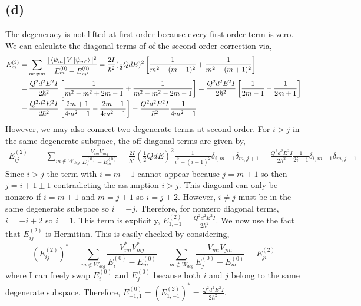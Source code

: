 \documentclass[12pt]{extarticle}
\begin{document}
\subsection*{(d)}

The degeneracy is not lifted at first order because every first order term is zero. We can calculate the diagonal terms of of the second order correction via,
\begin{align*}
E^{(2)}_m & = \sum_{m' \neq m} \frac{|\left< \psi_m \right| V \left| \psi_{m'} \right>|^2}{E^{(0)}_m - E^{(0)}_{m'}} = \frac{2I}{\hbar^2} (\tfrac{1}{2} QdE)^2 \left[ \frac{1}{m^2 - (m - 1)^2} + \frac{1}{m^2 - (m + 1)^2} \right] \\ 
& = \frac{Q^2 d^2 E^2 I}{2\hbar^2} \left[ \frac{1}{m^2 - m^2 + 2m - 1} + \frac{1}{m^2 - m^2 - 2m - 1} \right] = \frac{Q^2 d^2 E^2 I}{2\hbar^2} \left[ \frac{1}{2m - 1} - \frac{1}{2m + 1} \right] \\ & = \frac{Q^2 d^2 E^2 I}{2\hbar^2} \left[ \frac{2m + 1}{4m^2 - 1} - \frac{2m - 1}{4m^2 - 1} \right] = \frac{Q^2 d^2 E^2 I}{\hbar^2} \frac{1}{4m^2 - 1}
\end{align*}
However, we may also connect two degenerate terms at second order. For $i > j$ in the same degenerate subspace, the off-diagonal terms are given by,
\begin{align*}
E^{(2)}_{ij} & = \sum_{m \notin W_{deg}} \frac{V_{im} V_{m j}}{E^{(0)}_i - E^{(0)}_{m}} = \frac{2I}{\hbar^2} (\tfrac{1}{2} QdE)^2 \frac{1}{i^2 - (i - 1)^2} \delta_{i, m + 1} \delta_{m, j + 1} = \frac{Q^2 d^2 E^2 I}{2\hbar^2} \frac{1}{2 i - 1} \delta_{i, m + 1} \delta_{m, j + 1} 
\end{align*}
Since $i > j$ the term with $i = m - 1$ cannot appear because $j = m \pm 1$ so then $j = i + 1 \pm 1$ contradicting the assumption $i > j$. This diagonal can only be nonzero if $i = m + 1$ and $m = j + 1$ so $i = j + 2$. However, $i \neq j$ must be in the same degenerate subspace so $i = - j$. Therefore, for nonzero diagonal terms, $i = -i + 2$ so $i = 1$. This term is explicitly, $E^{(2)}_{1,-1} = \frac{Q^2 d^2 E^2 I}{2\hbar^2}$. We now use the fact that $E^{(2)}_{ij}$ is Hermitian. This is easily checked by considering,
\[ (E^{(2)}_{ij})^* = \sum_{m \notin W_{deg}} \frac{V_{im}^* V_{m j}^*}{E^{(0)}_i - E^{(0)}_{m}} = \sum_{m \notin W_{deg}} \frac{V_{mi} V_{jm}}{E^{(0)}_j - E^{(0)}_{m}} = E^{(2)}_{ji}\]
where I can freely swap $E^{(0)}_i$ and $E^{(0)}_j$ because both $i$ and $j$ belong to the same degenerate subspace. Therefore, $E^{(0)}_{-1, 1} = (E^{(2)}_{1,-1})^* =  \frac{Q^2 d^2 E^2 I}{2\hbar^2}$. \bigskip \\
\end{document}
